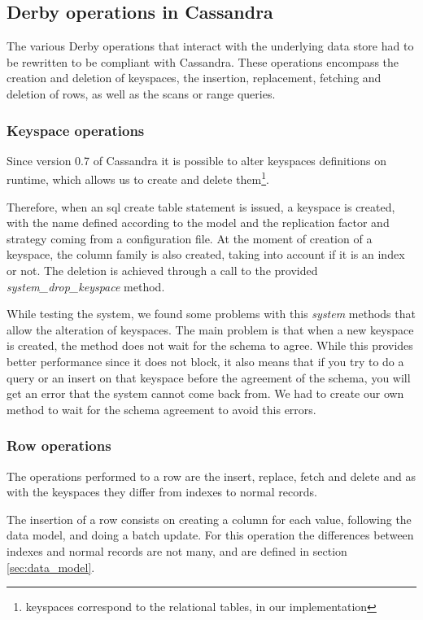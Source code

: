 \subsection{Derby operations in Cassandra}
\label{sec:cassandraops}

The various Derby operations that interact with the underlying data store had to be rewritten to be compliant with Cassandra. These operations encompass the creation and deletion of keyspaces, the insertion, replacement, fetching and deletion of rows, as well as the scans or range queries.

\subsubsection{Keyspace operations}
Since version 0.7 of Cassandra it is possible to alter keyspaces definitions on runtime, which allows us to create and delete them\footnote{keyspaces correspond to the relational tables, in our implementation}.

Therefore, when an \ac{sql} create table statement is issued, a keyspace is created, with the name defined according to the model and the replication factor and strategy coming from a configuration file. At the moment of creation of a keyspace, the column family is also created, taking into account if it is an index or not. The deletion is achieved through a call to the provided \emph{system\_drop\_keyspace} method.

While testing the system, we found some problems with this \emph{system} methods that allow the alteration of keyspaces. The main problem is that when a new keyspace is created, the method does not wait for the schema to agree. While this provides better performance since it does not block, it also means that if you try to do a query or an insert on that keyspace before the agreement of the schema, you will get an error that the system cannot come back from. We had to create our own method to wait for the schema agreement to avoid this errors.      

\subsubsection{Row operations}
The operations performed to a row are the insert, replace, fetch and delete and as with the keyspaces they differ from indexes to normal records.

The insertion of a row consists on creating a column for each value, following the data model, and doing a batch update. For this operation the differences between indexes and normal records are not many, and are defined in section \ref{sec:data_model}. 


